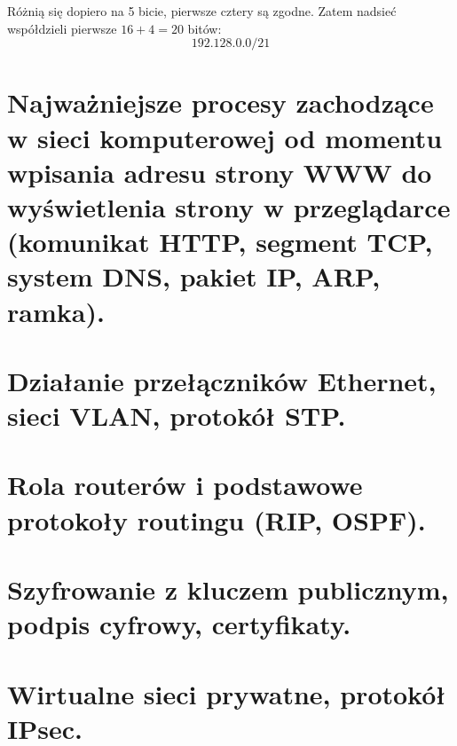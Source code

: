 \documentclass[main.tex]{subfiles}
\begin{document}
    Różnią się dopiero na 5 bicie, pierwsze cztery są zgodne. Zatem nadsieć współdzieli pierwsze $16+4=20$ bitów:
    \[192.128.0.0/21\]

    \newpage

    \section{Najważniejsze procesy zachodzące w sieci komputerowej od momentu wpisania adresu strony WWW do wyświetlenia strony w przeglądarce (komunikat HTTP, segment TCP, system DNS, pakiet IP, ARP, ramka).}
    \section{Działanie przełączników Ethernet, sieci VLAN, protokół STP.}
    \section{Rola routerów i podstawowe protokoły routingu (RIP, OSPF).}
    \section{Szyfrowanie z kluczem publicznym, podpis cyfrowy, certyfikaty.}
    \section{Wirtualne sieci prywatne, protokół IPsec.}
\end{document}
